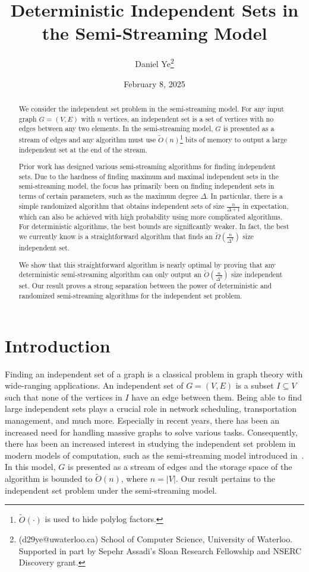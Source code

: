 \documentclass[11pt]{article}
\title{Deterministic Independent Sets in the Semi-Streaming Model}
\author{Daniel Ye\footnote{(d29ye@uwaterloo.ca) School of Computer Science, University of Waterloo. Supported in part by Sepehr Assadi’s Sloan Research Fellowship and NSERC Discovery grant.}}
\date{February 8, 2025}
\theoremstyle{definition}
\newcommand{\Ot}{\ensuremath{\widetilde{O}}}
\begin{document}
\maketitle

\begin{abstract}
We consider the independent set problem in the semi-streaming model. For any input graph $G=(V, E)$ with $n$ vertices, an independent set is a set of vertices with no edges between any two elements. In the semi-streaming model, $G$ is presented as a stream of edges and any algorithm must use $\Ot(n)$\footnote{$\Ot(\cdot)$ is used to hide polylog factors.} bits of memory to output a large independent set at the end of the stream.

\smallskip
Prior work has designed various semi-streaming algorithms for finding independent sets. Due to the hardness of finding maximum and maximal independent sets in the semi-streaming model, the focus has primarily been on finding independent sets in terms of certain parameters, such as the maximum degree $\Delta$. In particular, there is a simple randomized algorithm that obtains independent sets of size $\frac n{\Delta+1}$ in expectation, which can also be achieved with high probability using more complicated algorithms. For deterministic algorithms, the best bounds are significantly weaker. In fact, the best we currently know is a straightforward algorithm that finds an $\tilde\Omega\left(\frac n{\Delta^2}\right)$ size independent set.

\smallskip
We show that this straightforward algorithm is nearly optimal by proving that any deterministic semi-streaming algorithm can only output an $\Ot\left(\frac n{\Delta^2}\right)$ size independent set. Our result proves a strong separation between the power of deterministic and randomized semi-streaming algorithms for the independent set problem.
\end{abstract}

\newpage
\section{Introduction}
Finding an independent set of a graph is a classical problem in graph theory with wide-ranging applications. An independent set of $G=(V, E)$ is a subset $I\subseteq V$ such that none of the vertices in $I$ have an edge between them. Being able to find large independent sets plays a crucial role in network scheduling, transportation management, and much more. Especially in recent years, there has been an increased need for handling massive graphs to solve various tasks. Consequently, there has been an increased interest in studying the independent set problem in modern models of computation, such as the semi-streaming model introduced in~\cite{feigenbaum2005graph}. In this model, $G$ is presented as a stream of edges and the storage space of the algorithm is bounded to $\Ot(n)$, where $n=|V|$. Our result pertains to the independent set problem under the semi-streaming model. 
\vspace{-0.05cm}
\end{document}
